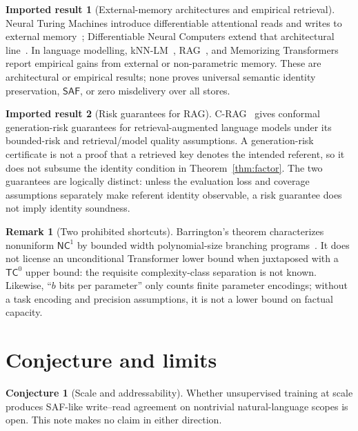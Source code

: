 \documentclass[11pt]{article}
\theoremstyle{definition}
\newtheorem{conjecture}{Conjecture}
\newtheorem{imported}{Imported result}
\newtheorem{remark}{Remark}
\theoremstyle{plain}
\newcommand{\SAF}{\mathsf{SAF}}
\begin{document}
\begin{imported}[External-memory architectures and empirical retrieval]
Neural Turing Machines introduce differentiable attentional reads and writes
to external memory~\citep{graves2014ntm}; Differentiable Neural Computers
extend that architectural line~\citep{graves2016dnc}.  In language modelling,
kNN-LM~\citep{khandelwal2020knnlm}, RAG~\citep{lewis2020rag}, and Memorizing
Transformers~\citep{wu2022memorizing} report empirical gains from external or
non-parametric memory.  These are architectural or empirical results; none
proves universal semantic identity preservation, \(\SAF\), or zero
misdelivery over all stores.
\end{imported}

\begin{imported}[Risk guarantees for RAG]
C-RAG~\citep{kang2024crag} gives conformal generation-risk guarantees for
retrieval-augmented language models under its bounded-risk and retrieval/model
quality assumptions.  A generation-risk certificate is not a proof that a
retrieved key denotes the intended referent, so it does not subsume the
identity condition in Theorem~\ref{thm:factor}.  The two guarantees are
logically distinct: unless the evaluation loss and coverage assumptions
separately make referent identity observable, a risk guarantee does not imply
identity soundness.
\end{imported}

\begin{remark}[Two prohibited shortcuts]
Barrington's theorem characterizes nonuniform \(\mathsf{NC}^1\) by bounded
width polynomial-size branching programs~\citep{barrington1989}.  It does
not license an unconditional Transformer lower bound when juxtaposed with a
\(\mathsf{TC}^0\) upper bound: the requisite complexity-class separation is
not known.  Likewise, ``\(b\) bits per parameter'' only counts finite
parameter encodings; without a task encoding and precision assumptions, it
is not a lower bound on factual capacity.
\end{remark}

\section{Conjecture and limits}

\begin{conjecture}[Scale and addressability]\label{conj:scale}
Whether unsupervised training at scale produces SAF-like write--read agreement
on nontrivial natural-language scopes is open.  This note makes no claim in
either direction.
\end{conjecture}
\end{document}
